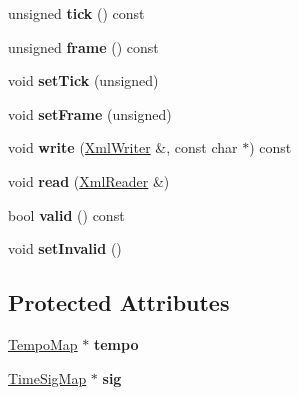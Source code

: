 \begin{DoxyCompactItemize}
\item 
\mbox{\label{class_ms_1_1_pos_a58ea1230fb57ca6b15f1d3606ff39320}} 
unsigned {\bfseries tick} () const
\item 
\mbox{\label{class_ms_1_1_pos_a0e3000284443d667e28a1828f264abda}} 
unsigned {\bfseries frame} () const
\item 
\mbox{\label{class_ms_1_1_pos_aa537e3d272d36ad09272b9ebcef7c149}} 
void {\bfseries set\+Tick} (unsigned)
\item 
\mbox{\label{class_ms_1_1_pos_a1df27472106b84e2a22a59410ae33304}} 
void {\bfseries set\+Frame} (unsigned)
\item 
\mbox{\label{class_ms_1_1_pos_a04b35e19958e2a01f706f0b8966f25d0}} 
void {\bfseries write} (\hyperlink{class_ms_1_1_xml_writer}{Xml\+Writer} \&, const char $\ast$) const
\item 
\mbox{\label{class_ms_1_1_pos_a74c89170e075dcd499e0efee6c69deda}} 
void {\bfseries read} (\hyperlink{class_ms_1_1_xml_reader}{Xml\+Reader} \&)
\item 
\mbox{\label{class_ms_1_1_pos_a350397f8500d5784e1bab9052930128d}} 
bool {\bfseries valid} () const
\item 
\mbox{\label{class_ms_1_1_pos_a70ca1ef8aa94fff95f29a3e902f91b76}} 
void {\bfseries set\+Invalid} ()
\end{DoxyCompactItemize}
\subsection*{Protected Attributes}
\begin{DoxyCompactItemize}
\item 
\mbox{\label{class_ms_1_1_pos_addfca6a9888ab6ced5f25651e9e33320}} 
\hyperlink{class_ms_1_1_tempo_map}{Tempo\+Map} $\ast$ {\bfseries tempo}
\item 
\mbox{\label{class_ms_1_1_pos_a97b6325ef251b517f6eac755ca2a2fcc}} 
\hyperlink{class_ms_1_1_time_sig_map}{Time\+Sig\+Map} $\ast$ {\bfseries sig}
\end{DoxyCompactItemize}
